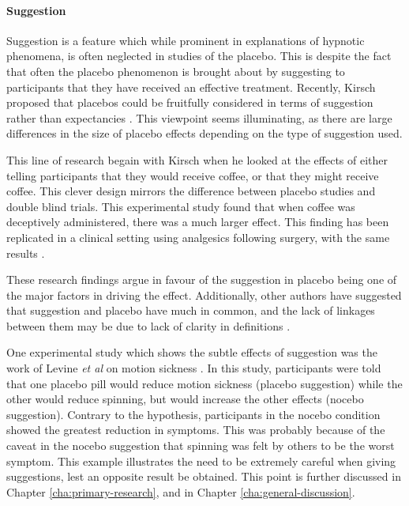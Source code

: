 \paragraph{Suggestion} 

Suggestion is a feature which while prominent in explanations of hypnotic phenomena, is often neglected in studies of the placebo. This is despite the fact that often the placebo phenomenon is brought about by suggesting to participants that they have received an effective treatment. Recently, Kirsch proposed that  placebos could be fruitfully considered in terms of suggestion rather than expectancies  \cite{Kirsch1999}. This viewpoint seems illuminating, as there are large differences in the size of placebo effects depending on the type of suggestion used. 

This line of research begain with Kirsch \cite{kirsch1988double} when he looked at the effects of either telling participants that they would receive coffee, or that they might receive coffee. This clever design  mirrors the difference between placebo studies and double blind trials. This experimental study found that when coffee was deceptively administered, there was a much larger effect. This finding has been replicated in a clinical setting using analgesics following surgery, with the same results \cite{Amanzio2001}. 

 These research findings argue in favour of the suggestion in placebo being one of the major factors in driving the effect. Additionally, other authors have suggested that suggestion and placebo have much in common, and the lack of linkages between them may be due to lack of clarity in definitions \cite{DePascalis2002}. 

One experimental study which shows the subtle effects of suggestion was the work of Levine \textit{et al}  on motion sickness \cite{Levine2006}.  In this study, participants were told that one placebo pill would reduce motion sickness (placebo suggestion) while the other would reduce spinning, but would increase the other effects (nocebo suggestion). Contrary to the hypothesis, participants in the nocebo condition showed the greatest reduction in symptoms. This was probably because of the caveat in the nocebo suggestion that spinning was felt by others to be the worst symptom. This example illustrates the need to be extremely careful when giving suggestions, lest an opposite result be obtained. This point is further discussed in Chapter \ref{cha:primary-research}, and in Chapter \ref{cha:general-discussion}. 

